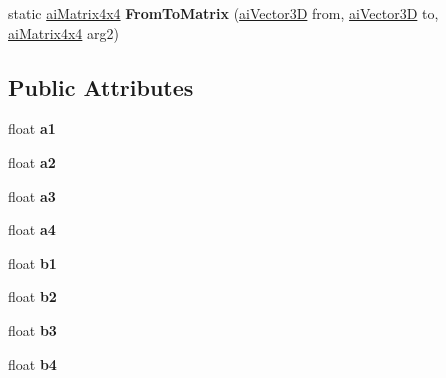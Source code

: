 \begin{DoxyCompactItemize}
\item 
\hypertarget{structai_matrix4x4_ac1faa50220b6e3399eade71a1885061c}{static \hyperlink{structai_matrix4x4}{ai\+Matrix4x4} {\bfseries From\+To\+Matrix} (\hyperlink{structai_vector3_d}{ai\+Vector3\+D} from, \hyperlink{structai_vector3_d}{ai\+Vector3\+D} to, \hyperlink{structai_matrix4x4}{ai\+Matrix4x4} arg2)}\label{structai_matrix4x4_ac1faa50220b6e3399eade71a1885061c}

\end{DoxyCompactItemize}
\subsection*{Public Attributes}
\begin{DoxyCompactItemize}
\item 
\hypertarget{structai_matrix4x4_aeabb269b7ef332d3c69c14d8af3d531c}{float {\bfseries a1}}\label{structai_matrix4x4_aeabb269b7ef332d3c69c14d8af3d531c}

\item 
\hypertarget{structai_matrix4x4_a9d36d992ba3cfc814913e0225a04b91b}{float {\bfseries a2}}\label{structai_matrix4x4_a9d36d992ba3cfc814913e0225a04b91b}

\item 
\hypertarget{structai_matrix4x4_a36f0d69cf678c3b5deea5a76f5624848}{float {\bfseries a3}}\label{structai_matrix4x4_a36f0d69cf678c3b5deea5a76f5624848}

\item 
\hypertarget{structai_matrix4x4_a184e1a78f61c430aa7b0079b42e4c2a0}{float {\bfseries a4}}\label{structai_matrix4x4_a184e1a78f61c430aa7b0079b42e4c2a0}

\item 
\hypertarget{structai_matrix4x4_a59667637f4d71bf4ebc1183bebe746fb}{float {\bfseries b1}}\label{structai_matrix4x4_a59667637f4d71bf4ebc1183bebe746fb}

\item 
\hypertarget{structai_matrix4x4_af5dcecf706021b313239b7113cb80daa}{float {\bfseries b2}}\label{structai_matrix4x4_af5dcecf706021b313239b7113cb80daa}

\item 
\hypertarget{structai_matrix4x4_a0f0bf4dfcf9dd562d71d5ed5a5342316}{float {\bfseries b3}}\label{structai_matrix4x4_a0f0bf4dfcf9dd562d71d5ed5a5342316}

\item 
\hypertarget{structai_matrix4x4_ae57a4a8b8f4509f5bdf90d7856c59281}{float {\bfseries b4}}\label{structai_matrix4x4_ae57a4a8b8f4509f5bdf90d7856c59281}


\end{DoxyCompactItemize}
